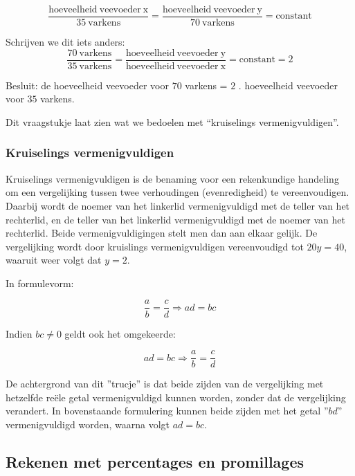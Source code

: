 \begin{equation*}
\frac{\mathrm{hoeveelheid\:veevoeder\:x}}{35\:\mathrm{varkens}}=\frac{\mathrm{hoeveelheid\:veevoeder\:y}}{70\:\mathrm{varkens}}=\text{constant}
\end{equation*}

Schrijven we dit iets anders: 
\begin{equation*}
\frac{70\:\mathrm{varkens}}{35\:\mathrm{varkens}}=\frac{\mathrm{hoeveelheid\:veevoeder\:y}}{\mathrm{hoeveelheid\:veevoeder\:x}}=\text{constant}=2
\end{equation*}

Besluit: de hoeveelheid veevoeder voor $70$ varkens = $2$ . hoeveelheid
veevoeder voor $35$ varkens.\medskip{}

Dit vraagstukje laat zien wat we bedoelen met ``kruiselings vermenigvuldigen''.

\subsubsection{Kruiselings vermenigvuldigen}

Kruiselings vermenigvuldigen is de benaming voor een rekenkundige handeling om een vergelijking tussen twee verhoudingen (evenredigheid) te vereenvoudigen. Daarbij wordt de noemer van het linkerlid vermenigvuldigd met de teller van het rechterlid, en de teller van het linkerlid vermenigvuldigd met de noemer van het rechterlid. Beide vermenigvuldigingen stelt men dan aan elkaar gelijk. De vergelijking  wordt door kruislings vermenigvuldigen vereenvoudigd tot $20y=40$, waaruit weer volgt dat $y=2$.

In formulevorm:

\begin{equation*}
\frac{a}{b} = \frac{c}{d} \Rightarrow ad = bc
\end{equation*}

Indien $bc \neq 0$ geldt ook het omgekeerde:

\begin{equation}
ad=bc \Rightarrow \frac{a}{b}=\frac{c}{d}
\end{equation}

De achtergrond van dit ''trucje'' is dat beide zijden van de vergelijking met hetzelfde re\"ele getal vermenigvuldigd kunnen worden, zonder dat de vergelijking verandert. In bovenstaande formulering kunnen beide zijden met het getal ''$bd$'' vermenigvuldigd worden, waarna volgt $ad=bc$.

\subsection{Rekenen met percentages en promillages}

